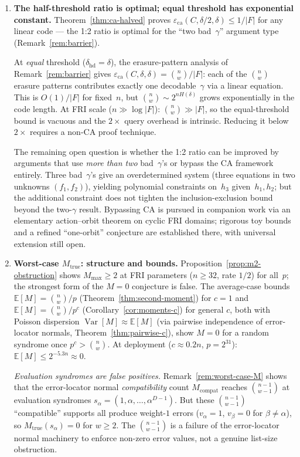 \documentclass[11pt]{article}
\newcommand{\EE}{\mathbb{E}}
\DeclareMathOperator{\Var}{Var}
\begin{document}
\begin{enumerate}
\item \textbf{The half-threshold ratio is optimal; equal threshold has exponential constant.}
Theorem~\ref{thm:ca-halved} proves $\varepsilon_{\mathrm{ca}}(C, \delta/2, \delta) \leq 1/|F|$ for any linear code --- the 1:2 ratio is optimal for the ``two bad~$\gamma$'' argument type (Remark~\ref{rem:barrier}).

At \emph{equal} threshold ($\delta_{\mathrm{hd}} = \delta$), the erasure-pattern analysis of Remark~\ref{rem:barrier} gives $\varepsilon_{\mathrm{ca}}(C, \delta, \delta) = \binom{n}{w}/|F|$: each of the $\binom{n}{w}$ erasure patterns contributes exactly one decodable~$\gamma$ via a linear equation. This is $O(1)/|F|$ for fixed~$n$, but $\binom{n}{w} {\sim} 2^{nH(\delta)}$ grows exponentially in the code length. At FRI scale ($n \gg \log|F|$): $\binom{n}{w} \gg |F|$, so the equal-threshold bound is vacuous and the $2\times$ query overhead is intrinsic. Reducing it below~$2\times$ requires a non-CA proof technique.

The remaining open question is whether the 1:2 ratio can be improved by arguments that use \emph{more than two} bad~$\gamma$'s or bypass the CA framework entirely. Three bad~$\gamma$'s give an overdetermined system (three equations in two unknowns $(f_1, f_2)$), yielding polynomial constraints on~$h_3$ given~$h_1, h_2$; but the additional constraint does not tighten the inclusion-exclusion bound beyond the two-$\gamma$ result. Bypassing CA is pursued in companion work via an elementary action--orbit theorem on cyclic FRI domains; rigorous toy bounds and a refined ``one-orbit'' conjecture are established there, with universal extension still open.

\item \textbf{Worst-case $M_{\mathrm{true}}$: structure and bounds.}
Proposition~\ref{prop:m2-obstruction} shows $M_{\max} \geq 2$ at FRI parameters ($n \geq 32$, rate $1/2$) for all~$p$; the strongest form of the $M = 0$ conjecture is false. The average-case bounds $\EE[M] = \binom{n}{w}/p$ (Theorem~\ref{thm:second-moment}) for $c = 1$ and $\EE[M] = \binom{n}{w}/p^c$ (Corollary~\ref{cor:moments-c}) for general $c$, both with Poisson dispersion $\Var[M] \approx \EE[M]$ (via pairwise independence of error-locator normals, Theorem~\ref{thm:pairwise-c}), show $M = 0$ for a random syndrome once $p^c > \binom{n}{w}$. At deployment ($c \approx 0.2n$, $p = 2^{31}$): $\EE[M] \leq 2^{-5.3n} \approx 0$.

\emph{Evaluation syndromes are false positives.} Remark~\ref{rem:worst-case-M} shows that the error-locator normal \emph{compatibility} count $M_{\mathrm{compat}}$ reaches $\binom{n-1}{w-1}$ at evaluation syndromes $s_\alpha = (1, \alpha, \ldots, \alpha^{D-1})$. But these $\binom{n-1}{w-1}$ ``compatible'' supports all produce weight-$1$ errors ($v_\alpha = 1$, $v_\beta = 0$ for $\beta \neq \alpha$), so $M_{\mathrm{true}}(s_\alpha) = 0$ for $w \geq 2$. The $\binom{n-1}{w-1}$ is a failure of the error-locator normal machinery to enforce non-zero error values, not a genuine list-size obstruction.


\end{enumerate}
\end{document}
